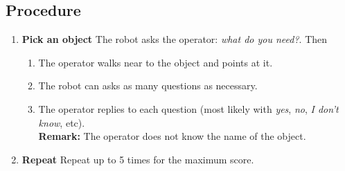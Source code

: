 \subsection*{Procedure}
\begin{enumerate}[nosep]
	\item \textbf{Pick an object} The robot asks the operator: \emph{what do you need?}. %
	Then
	\begin{enumerate}[nosep]
		\item The operator walks near to the object and points at it.
		\item The robot can asks as many questions as necessary.
		\item The operator replies to each question (most likely with \emph{yes}, \emph{no}, \emph{I don't know}, etc).
		\\\textbf{Remark:} The operator does not know the name of the object.
	\end{enumerate}
  \item \textbf{Repeat} Repeat up to 5 times for the maximum score.
\end{enumerate}


%
%
